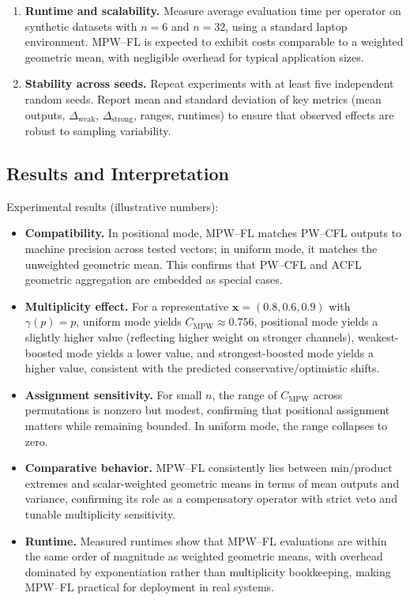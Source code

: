 \documentclass[11pt]{article}
\begin{document}
\begin{enumerate}[label=\textbf{E\arabic*}.]
  \item \textbf{Runtime and scalability.} Measure average evaluation time per operator on synthetic datasets with $n=6$ and $n=32$, using a standard laptop environment. MPW--FL is expected to exhibit costs comparable to a weighted geometric mean, with negligible overhead for typical application sizes.

  \item \textbf{Stability across seeds.} Repeat experiments with at least five independent random seeds. Report mean and standard deviation of key metrics (mean outputs, $\Delta_{\mathrm{weak}}$, $\Delta_{\mathrm{strong}}$, ranges, runtimes) to ensure that observed effects are robust to sampling variability.
\end{enumerate}

\subsection{Results and Interpretation}
\label{subsec:results-interpretation}

Experimental results (illustrative numbers):

\begin{itemize}
  \item \textbf{Compatibility.} In positional mode, MPW--FL matches PW--CFL outputs to machine precision across tested vectors; in uniform mode, it matches the unweighted geometric mean. This confirms that PW--CFL and ACFL geometric aggregation are embedded as special cases.

  \item \textbf{Multiplicity effect.} For a representative $\mathbf{x} = (0.8, 0.6, 0.9)$ with $\gamma(p)=p$, uniform mode yields $C_{\mathrm{MPW}} \approx 0.756$, positional mode yields a slightly higher value (reflecting higher weight on stronger channels), weakest-boosted mode yields a lower value, and strongest-boosted mode yields a higher value, consistent with the predicted conservative/optimistic shifts.

  \item \textbf{Assignment sensitivity.} For small $n$, the range of $C_{\mathrm{MPW}}$ across permutations is nonzero but modest, confirming that positional assignment matters while remaining bounded. In uniform mode, the range collapses to zero.

  \item \textbf{Comparative behavior.} MPW--FL consistently lies between min/product extremes and scalar-weighted geometric means in terms of mean outputs and variance, confirming its role as a compensatory operator with strict veto and tunable multiplicity sensitivity.

  \item \textbf{Runtime.} Measured runtimes show that MPW--FL evaluations are within the same order of magnitude as weighted geometric means, with overhead dominated by exponentiation rather than multiplicity bookkeeping, making MPW--FL practical for deployment in real systems.
\end{itemize}
\end{document}
